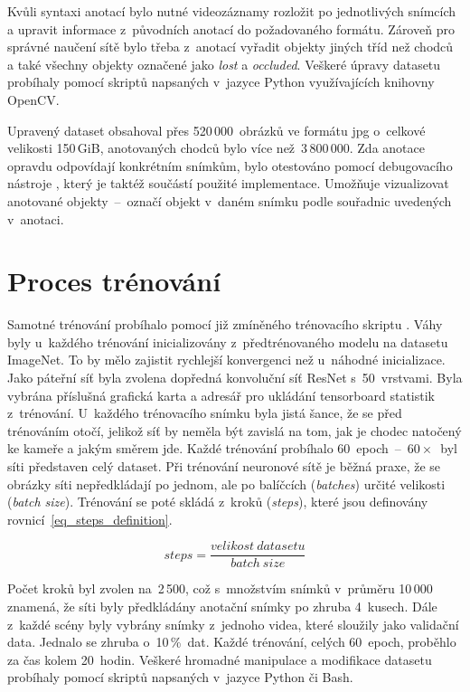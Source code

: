 Kvůli syntaxi anotací bylo nutné videozáznamy rozložit po jednotlivých snímcích a upravit informace z~původních anotací do požadovaného formátu. Zároveň pro správné naučení sítě bylo třeba z~anotací vyřadit objekty jiných tříd než chodců a také všechny objekty označené jako \textit{lost} a \textit{occluded}. Veškeré úpravy datasetu probíhaly pomocí skriptů napsaných v~jazyce Python využívajících knihovny OpenCV.

Upravený dataset obsahoval přes 520\,000~obrázků ve formátu jpg o~celkové velikosti 150\,GiB, anotovaných chodců bylo více než~3\,800\,000. Zda anotace opravdu odpovídají konkrétním snímkům, bylo otestováno pomocí debugovacího nástroje , který je taktéž součástí použité implementace. Umožňuje vizualizovat anotované objekty~--~označí objekt v~daném snímku podle souřadnic uvedených v~anotaci.


\section{Proces trénování}
\label{sec_training_process}

Samotné trénování probíhalo pomocí již zmíněného trénovacího skriptu . Váhy byly u~každého trénování inicializovány z~předtrénovaného modelu na datasetu ImageNet. To by mělo zajistit rychlejší konvergenci než u~náhodné inicializace. Jako páteřní síť byla zvolena dopředná konvoluční síť ResNet s~50~vrstvami. Byla vybrána příslušná grafická karta a adresář pro ukládání tensorboard statistik z~trénování. U~každého trénovacího snímku byla jistá šance, že se před trénováním otočí, jelikož síť by neměla být zavislá na tom, jak je chodec natočený ke kameře a jakým směrem jde. Každé trénování probíhalo 60~epoch~--~$60\times$~byl síti představen celý dataset. Při trénování neuronové sítě je běžná praxe, že se obrázky síti nepředkládají po jednom, ale po balíčcích (\textit{batches}) určité velikosti (\textit{batch size}). Trénování se poté skládá z~kroků (\textit{steps}), které jsou definovány rovnicí~\ref{eq_steps_definition}.

\begin{equation}
    steps = \frac{velikost \: datasetu}{batch \: size}
    \label{eq_steps_definition}
\end{equation}

Počet kroků byl zvolen na~2\,500, což s~množstvím snímků v~průměru 10\,000 znamená, že síti byly předkládány anotační snímky po zhruba 4~kusech. Dále z~každé scény byly vybrány snímky z~jednoho videa, které sloužily jako validační data. Jednalo se zhruba o~10\,\%~dat. Každé trénování, celých 60~epoch, proběhlo za čas kolem 20~hodin. Veškeré hromadné manipulace a modifikace datasetu probíhaly pomocí skriptů napsaných v~jazyce Python či Bash.

